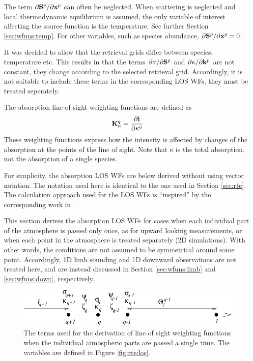   The term $\partial \mathbf{S}^p/\partial \mathbf{x}^p$ can often be neglected.
  When scattering is neglected and local thermodynamic equilibrium is
  assumed, the only variable of interest affecting the source function
  is the temperature.  See further Section \ref{sec:wfuns:temp}. For
  other variables, such as species abundance, $\partial
  \mathbf{S}^p/\partial \mathbf{x}^p=0$.
  
  It was decided to allow that the retrieval grids differ between
  species, temperature etc. This results in that the terms $\partial
  \sigma/ \partial \mathbf{S}^p$ and $\partial \kappa/ \partial
  \mathbf{k}^p$ are not constant, they change according to the selected
  retrieval grid. Accordingly, it is not suitable to include these terms
  in the corresponding LOS WFs, they must be treated seperately.
  
  

 \label{sec:wfuns:absloswfs}

 The absorption line of sight weighting functions are defined as
 \begin{equation}
   \mathbf{K}_{\kappa}^q =  \frac{\partial\mathbf{i}}{\partial \kappa^q}
  \label{eq:wfuns:loswfs}
 \end{equation}
 These weighting functions express how the intensity is
 affected by changes of the absorption at the points of the line of
 sight. Note that $\kappa$ is the total absorption, not the
 absorption of a single species. 
 
 For simplicity, the absorption LOS WFs are below derived without
 using vector notation. The notation used here is identical to the one
 used in Section \ref{sec:rte}. The calculation approach used for the
 LOS WFs is ``inspired'' by the corresponding work in
 \citet{master00}.


 \label{sec:wfuns:single}
 
 This section derives the absorption LOS WFs for cases when each
 individual part of the atmosphere is passed only once, as for upward
 looking measurements, or when each point in the atmosphere is treated
 separately (2D simulations). With other words, the conditions are not
 assumed to be symmetrical around some point. Accordingly, 1D limb
 sounding and 1D downward observations are not treated here, and are
 instead discussed in Section \ref{sec:wfuns:limb} and
 \ref{sec:wfuns:down}, respectively.

 \begin{figure}[t]
  \begin{center}
   \includegraphics*[width=0.95\hsize]{Figs/wf1}
   \caption{The terms used for the derivation of line of sight weighting
            functions when the individual atmospheric parts are passed a
            single time. The variables are defined in Figure 
            \ref{fig:rte:los}.}
   \label{fig:wfuns:single}  
  \end{center}
 \end{figure}

